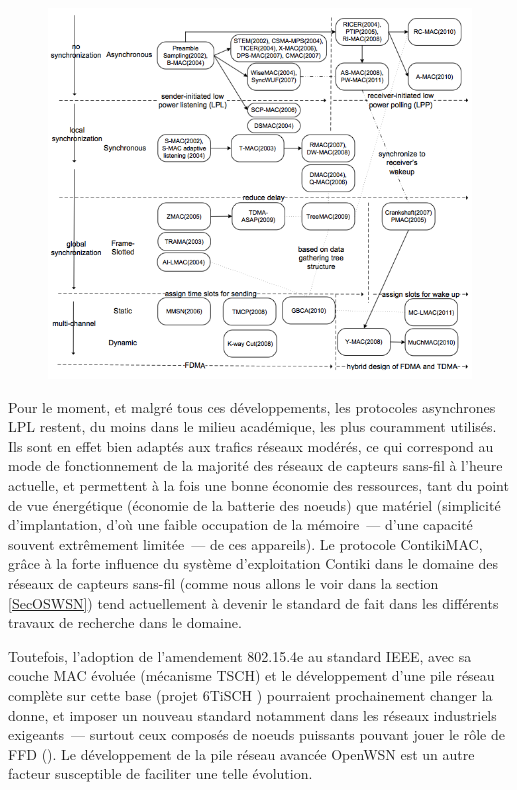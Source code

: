 \begin{figure}[!htb]
\centering
\includegraphics[width=12.5cm]{images/ch3-taxonomie-mac.png}
\label{FigTaxonomieMAC}
\end{figure}

Pour le moment, et malgré tous ces développements, les protocoles
asynchrones LPL restent, du moins dans le milieu académique, les plus
couramment utilisés. Ils sont en effet bien adaptés aux trafics réseaux
modérés, ce qui correspond au mode de fonctionnement de la majorité des
réseaux de capteurs sans-fil à l'heure actuelle, et permettent à la fois
une bonne économie des ressources, tant du point de vue énergétique
(économie de la batterie des noeuds) que matériel (simplicité
d'implantation, d'où une faible occupation de la mémoire~--- d'une
capacité souvent extrêmement limitée~--- de ces appareils).
Le protocole ContikiMAC, grâce à la forte influence du système
d'exploitation Contiki dans le domaine des réseaux de capteurs
sans-fil (comme nous allons le voir dans la section \vref{SecOSWSN})
tend actuellement à devenir le standard de fait dans les différents
travaux de recherche dans le domaine.

Toutefois, l'adoption de l'amendement 802.15.4e au standard IEEE,
avec sa couche MAC évoluée (mécanisme TSCH) et le développement d'une
pile réseau complète sur cette base (projet 6TiSCH \cite{6TiSCH}
\cite{6TiSCHbis} \cite{6TiSCHter}) pourraient prochainement changer
la donne, et imposer un nouveau standard notamment dans les réseaux
industriels exigeants~--- surtout ceux composés de noeuds puissants
pouvant jouer le rôle de FFD ().
Le développement de la pile réseau avancée OpenWSN est un autre facteur
susceptible de faciliter une telle évolution.



